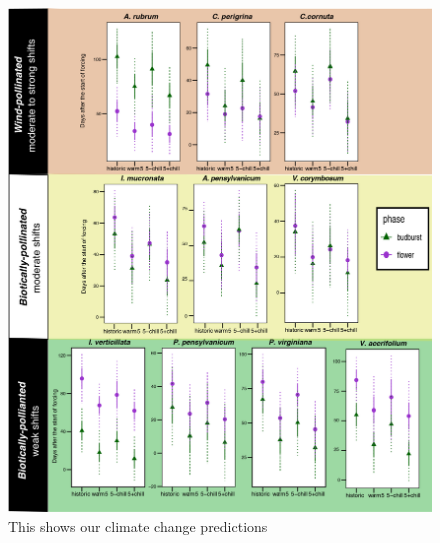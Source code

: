 \documentclass[11pt]{article}
\begin{document}
    \begin{figure}[h!]
    \centering
 \includegraphics[width=\textwidth]{..//Plots/Flobuds_manuscript_figs/climpredictions.jpg}
    \caption{This shows our climate change predictions }
    \label{fig:preddy}
\end{figure}
\end{document}
